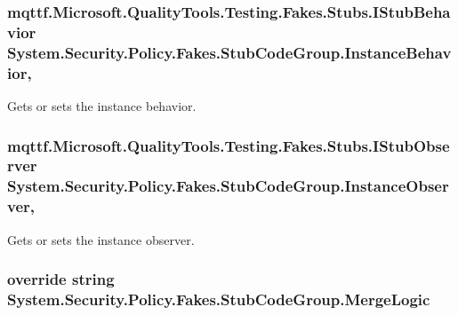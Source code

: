 \hypertarget{class_system_1_1_security_1_1_policy_1_1_fakes_1_1_stub_code_group_a03cd05acfab09a6f9df9e2e2f90ce315}{
\subsubsection[{Instance\-Behavior}]{\setlength{\rightskip}{0pt plus 5cm}mqttf.\-Microsoft.\-Quality\-Tools.\-Testing.\-Fakes.\-Stubs.\-I\-Stub\-Behavior System.\-Security.\-Policy.\-Fakes.\-Stub\-Code\-Group.\-Instance\-Behavior\hspace{0.3cm}{\ttfamily [get]}, {\ttfamily [set]}}}\label{class_system_1_1_security_1_1_policy_1_1_fakes_1_1_stub_code_group_a03cd05acfab09a6f9df9e2e2f90ce315}


Gets or sets the instance behavior.

\hypertarget{class_system_1_1_security_1_1_policy_1_1_fakes_1_1_stub_code_group_a6e5fa15cd0eb4ce5a06498ed6ed9b2df}{
\subsubsection[{Instance\-Observer}]{\setlength{\rightskip}{0pt plus 5cm}mqttf.\-Microsoft.\-Quality\-Tools.\-Testing.\-Fakes.\-Stubs.\-I\-Stub\-Observer System.\-Security.\-Policy.\-Fakes.\-Stub\-Code\-Group.\-Instance\-Observer\hspace{0.3cm}{\ttfamily [get]}, {\ttfamily [set]}}}\label{class_system_1_1_security_1_1_policy_1_1_fakes_1_1_stub_code_group_a6e5fa15cd0eb4ce5a06498ed6ed9b2df}


Gets or sets the instance observer.

\hypertarget{class_system_1_1_security_1_1_policy_1_1_fakes_1_1_stub_code_group_ae46be593e6687d6048c5f6152e5b4a6f}{
\subsubsection[{Merge\-Logic}]{\setlength{\rightskip}{0pt plus 5cm}override string System.\-Security.\-Policy.\-Fakes.\-Stub\-Code\-Group.\-Merge\-Logic\hspace{0.3cm}{\ttfamily [get]}}}\label{class_system_1_1_security_1_1_policy_1_1_fakes_1_1_stub_code_group_ae46be593e6687d6048c5f6152e5b4a6f}


